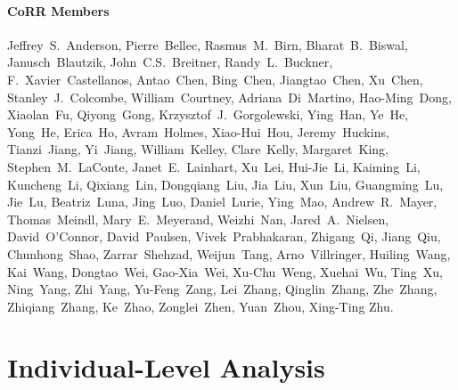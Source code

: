 \documentclass[11pt]{article}
\begin{document}

\paragraph{CoRR Members}
{\small
Jeffrey~S.~Anderson, Pierre~Bellec, Rasmus~M.~Birn, Bharat~B.~Biswal, Janusch~Blautzik, John~C.S.~Breitner, Randy~L.~Buckner, F.~Xavier~Castellanos, Antao~Chen, Bing~Chen, Jiangtao~Chen, Xu~Chen, Stanley~J.~Colcombe, William~Courtney, Adriana~Di~Martino, Hao-Ming~Dong, Xiaolan~Fu, Qiyong~Gong, Krzysztof~J.~Gorgolewski, Ying~Han, Ye~He, Yong~He, Erica~Ho, Avram~Holmes, Xiao-Hui~Hou, Jeremy~Huckins, Tianzi~Jiang, Yi~Jiang, William~Kelley, Clare~Kelly, Margaret~King, Stephen~M.~LaConte, Janet~E.~Lainhart, Xu~Lei, Hui-Jie~Li, Kaiming~Li, Kuncheng~Li, Qixiang~Lin, Dongqiang~Liu, Jia~Liu, Xun~Liu, Guangming~Lu, Jie~Lu, Beatriz~Luna, Jing~Luo, Daniel~Lurie, Ying~Mao, Andrew~R.~Mayer, Thomas~Meindl, Mary~E.~Meyerand, Weizhi~Nan, Jared~A.~Nielsen, David~O’Connor, David~Paulsen, Vivek~Prabhakaran, Zhigang~Qi, Jiang~Qiu, Chunhong~Shao, Zarrar~Shehzad, Weijun~Tang, Arno~Villringer, Huiling~Wang, Kai~Wang, Dongtao~Wei, Gao-Xia~Wei, Xu-Chu~Weng, Xuehai~Wu, Ting~Xu, Ning~Yang, Zhi~Yang, Yu-Feng~Zang, Lei~Zhang, Qinglin~Zhang, Zhe~Zhang, Zhiqiang~Zhang, Ke~Zhao, Zonglei~Zhen, Yuan~Zhou, Xing-Ting Zhu.
}

\vspace{-10pt}



\begin{spacing}{0.3}
{\footnotesize  }
\end{spacing}

\clearpage
\appendix

\renewcommand\thesection{Appendix~\Alph{section}}
\renewcommand{\thefigure}{S\arabic{figure}}
\setcounter{figure}{0}

%

\section{Individual-Level Analysis}
\label{app:pipe}
\end{document}
